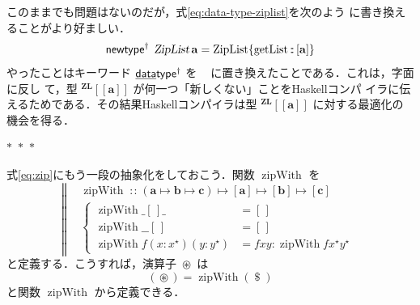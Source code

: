 \documentclass[a5paper,twoside,fleqn,draft]{jsbook}
\def\[{[\![}
\def\]{]\!]}
\newcommand{\separator}{\begin{center}$*$~$*$~$*$\end{center}}
\newcommand{\programminglanguage}[1]{\textsf{#1}}
\newcommand{\haskell}{\programminglanguage{Haskell}}
\newcommand{\mBrace}{\Vert}
\newcommand{\mKeyword}[1]{\mathsf{#1}}
\newcommand{\mKeywordUnderline}[1]{\text{\underline{\textsf{#1}}}}
\newcommand{\mDataTypeKeyword}{\mKeywordUnderline{data}\mKeyword{type}}
\newcommand{\mNewTypeDeclKeyword}{\mKeyword{newtype}}
\DeclareMathOperator{\mDataTypePolymorphic}{\mDataTypeKeyword^\dagger}
\DeclareMathOperator{\mNewTypeDeclPolymorphic}{\mNewTypeDeclKeyword^\dagger}
\newcommand{\mEmptyList}{{[\,]}}
\newcommand{\mSpecialFunc}[1]{#1}
\DeclareMathOperator{\mGetList}{\mSpecialFunc{getList}}
\DeclareMathOperator{\mZipWith}{\mSpecialFunc{zipWith}}
\DeclareMathOperator{\mApply}{\$}
\DeclareMathOperator{\mIn}{{:\!:}}
\DeclareMathOperator{\mMapsTo}{\mapsto}
\DeclareMathOperator{\mZip}{\circledast}
\newcommand{\mType}[1]{\mathbf{#1}} %
\newcommand{\mA}{\mType{a}}
\newcommand{\mB}{\mType{b}}
\newcommand{\mC}{\mType{c}}
\newcommand{\mTypeAssemble}[2]{{}^\mType{#1}\[\mType{#2}\]}
\newcommand{\mZipListType}[1]{\mTypeAssemble{ZL}{#1}}
\newcommand{\mTypeConstructor}[1]{\textsl{#1}}
\DeclareMathOperator{\mZipListTypeConstructor}{\mTypeConstructor{ZipList}}
\newcommand{\mValueConstructor}[1]{\mathrm{#1}}
\newcommand{\mValueRecordBeginWith}[1]{\mValueConstructor{#1}\{}
\newcommand{\mValueRecordEnd}{\}}
\newcommand{\mValueRecordWith}[2]{\mValueRecordBeginWith{#1}{#2}\mValueRecordEnd}
\newcommand{\mZipListRecordWith}[1]{\mValueRecordWith{ZipList}{#1}}
\newcommand{\mList}[1]{{#1}^\mathrm{\star}}
\newcommand{\mProjEXP}[2]{#1\mMapsTo#2} %
\begin{document}
このままでも問題はないのだが，式\eqref{eq:data-type-ziplist}を次のよう
に書き換えることがより好ましい．
\begin{equation}
  \mNewTypeDeclPolymorphic\;
  \mZipListTypeConstructor\mA
  =\mZipListRecordWith{\mGetList\mIn{}[\mA]}
\end{equation}
やったことはキーワード $\mDataTypePolymorphic$ を
$\mNewTypeDeclPolymorphic$ に置き換えたことである．これは，字面に反し
て，型 $\mZipListType{a}$ が何一つ「新しくない」ことを\haskell コンパ
イラに伝えるためである．その結果\haskell コンパイラは型
$\mZipListType{a}$ に対する最適化の機会を得る．

\separator

式\eqref{eq:zip}にもう一段の抽象化をしておこう．関数 $\mZipWith$ を
\begin{equation}
  \left\mBrace
  \begin{aligned}
    {}&\mZipWith\mIn{}\mProjEXP{\mProjEXP{\mProjEXP{(\mProjEXP{\mA }
          {\mProjEXP{\mB }{\mC }})}
        {[\mA]}}{[\mB]}}{[\mC]}\\
    {}&\left\{\begin{aligned}
    \mZipWith\_\mEmptyList\_
    &=\mEmptyList\\
    \mZipWith\_\_\mEmptyList
    &=\mEmptyList\\
    \mZipWith f(x:\mList{x})(y:\mList{y})
    &=fxy:\mZipWith f\mList{x}\mList{y}
    \end{aligned}
    \right.
  \end{aligned}
  \right.
\end{equation}
と定義する．こうすれば，演算子 $\mZip$ は
\begin{equation}
  (\mZip)
  =\mZipWith(\mApply)
\end{equation}
と関数 $\mZipWith$ から定義できる．
\end{document}
